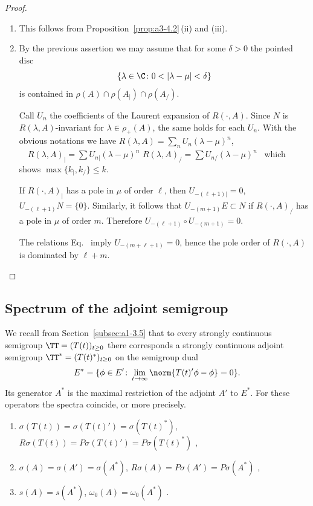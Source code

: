\begin{proof}
\begin{enumerate}[\upshape (i), wide, labelindent=.25em]
\item 
This follows from Proposition~\ref{prop:a3-4.2}\,(ii) and (iii).

\item 
By the previous assertion we may assume that for some $\delta > 0$ the pointed disc
\[
\{\lambda \in \C \colon 0 < |\lambda-\mu| < \delta\}
\]
is contained in $\rho(A) \cap \rho(A_{|}) \cap \rho(A_{/})$.

Call $U_{n}$ the coefficients of the Laurent expansion of\/ $R(\cdot,A)$.
Since $N$ is $R(\lambda,A)$-invariant for $\lambda \in \rho_{+}(A)$, the same holds for each $U_{n}$.
With the obvious notations we have \quad
$R(\lambda,A) = \sum_{n} U_{n}(\lambda-\mu)^{n}$, $\quad R(\lambda,A)_{|} = \sum U_{n|}(\lambda-\mu)^{n}$ \quad {} \quad $R(\lambda,A)_{/} = \sum U_{n/}(\lambda-\mu)^{n}$~
which shows $\max\{k_{|},k_{/}\} \leq k$.

If\/ $R(\cdot,A)_{|}$ has a pole in $\mu$ of order $\ell$, then $U_{-(\ell+1)|} = 0$, \ie $U_{-(\ell+1)}N = \{0\}$.
Similarly, it follows that $U_{-(m+1)}E \subset N$ if\/ $R(\cdot,A)_{/}$ has a pole in $\mu$ of order $m$.
Therefore $U_{-(\ell+1)} \circ U_{-(m+1)} = 0$.

The relations Eq.~ imply $U_{-(m+\ell+1)} = 0$, hence the pole order of\/ $R(\cdot,A)$ is dominated 
by $\ell + m$.
\end{enumerate}
\end{proof}

\subsection{Spectrum of the adjoint semigroup}\label{subsec:a3-4.4}%
We recall from Section~\ref{subsec:a1-3.5} that to every strongly continuous semigroup $\TT = (T(t))_{t \geq 0}$ there corresponds a strongly continuous adjoint semigroup $\TT^{*} = (T(t)^{*})_{t \geq 0}$ on the semigroup dual
\[
E^{*} = \{\phi \in E' \colon \lim_{t \to \infty} \norm{T(t)'\phi-\phi} = 0\} .
\]
Its generator $A^{*}$ is the maximal restriction of the adjoint $A'$ to $E^{*}$.
For these operators the spectra coincide, or more precisely.
\begin{enumerate}[\upshape (i)]
\item 
$\sigma(T(t)) = \sigma(T(t)') = \sigma(T(t)^{*})$,\\
$R\sigma(T(t)) = P\sigma(T(t)') = P\sigma(T(t)^{*})$ ,

\item 
$\sigma(A) = \sigma(A') = \sigma(A^{*})$, $R\sigma(A) = P\sigma(A') = P\sigma(A^{*})$ ,
\item 
$s(A) = s(A^{*})$, $\omega_{0}(A) = \omega_{0}(A^{*})$ .
\end{enumerate}

